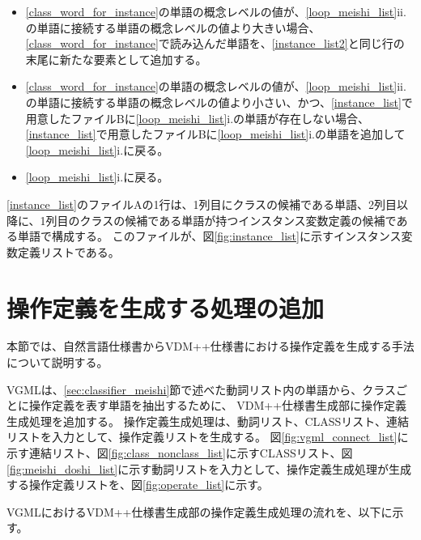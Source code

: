 \begin{enumerate}
\begin{enumerate}
\begin{enumerate}
                        \begin{itemize}
                            \item \ref{class_word_for_instance}の単語の概念レベルの値が、\ref{loop_meishi_list}ii.の単語に接続する単語の概念レベルの値より大きい場合、\ref{class_word_for_instance}で読み込んだ単語を、\ref{instance_list2}と同じ行の末尾に新たな要素として追加する。
                            \item \ref{class_word_for_instance}の単語の概念レベルの値が、\ref{loop_meishi_list}ii.の単語に接続する単語の概念レベルの値より小さい、かつ、\ref{instance_list}で用意したファイルBに\ref{loop_meishi_list}i.の単語が存在しない場合、\ref{instance_list}で用意したファイルBに\ref{loop_meishi_list}i.の単語を追加して\ref{loop_meishi_list}i.に戻る。
                            \item \ref{loop_meishi_list}i.に戻る。
                        \end{itemize}
                \end{enumerate}
        \end{enumerate}
\end{enumerate}

\ref{instance_list}のファイルAの1行は、1列目にクラスの候補である単語、2列目以降に、1列目のクラスの候補である単語が持つインスタンス変数定義の候補である単語で構成する。
このファイルが、図\ref{fig:instance_list}に示すインスタンス変数定義リストである。

\section{操作定義を生成する処理の追加}
\label{sec:operate_generate}
本節では、自然言語仕様書からVDM++仕様書における操作定義を生成する手法について説明する。

VGMLは、\ref{sec:classifier_meishi}節で述べた動詞リスト内の単語から、クラスごとに操作定義を表す単語を抽出するために、
VDM++仕様書生成部に操作定義生成処理を追加する。
操作定義生成処理は、動詞リスト、CLASSリスト、連結リストを入力として、操作定義リストを生成する。
図\ref{fig:vgml_connect_list}に示す連結リスト、図\ref{fig:class_nonclass_list}に示すCLASSリスト、図\ref{fig:meishi_doshi_list}に示す動詞リストを入力として、操作定義生成処理が生成する操作定義リストを、図\ref{fig:operate_list}に示す。

VGMLにおけるVDM++仕様書生成部の操作定義生成処理の流れを、以下に示す。

